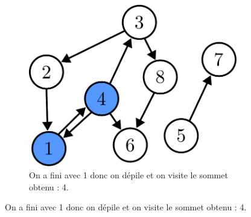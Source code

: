 \documentclass{article}
\begin{document}
\begin{itemize}
\begin{figure}[b]
\begin{subfigure}[t]{0.3\linewidth}
			\includegraphics[width=0.9\linewidth]{../figures/bfs3.pdf}
			\caption{On a fini avec 1 donc on dépile et on visite le sommet obtenu : 4.}
		\end{subfigure}
		

\end{figure}
\end{itemize}
\end{document}
